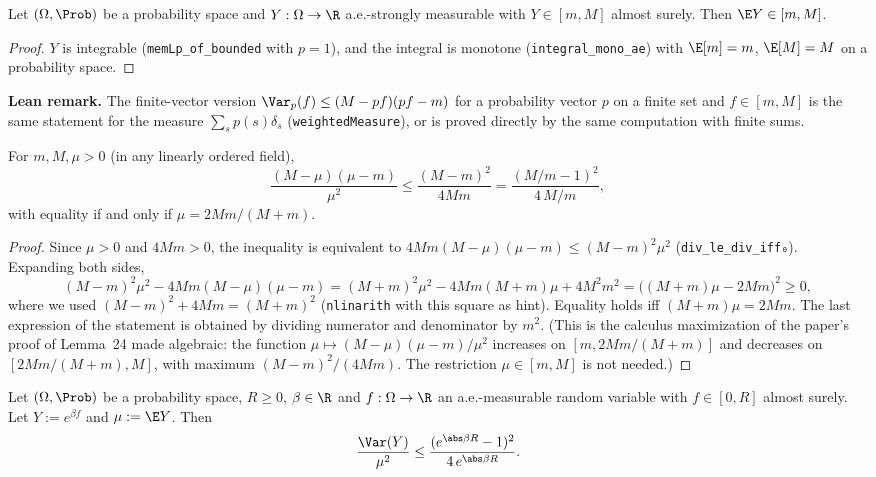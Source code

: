 \begin{lemma}\label{lem:pana_integral_mem_Icc}
\leanok
Let $(\Omega, \Prob)$ be a probability space and $Y : \Omega \to \R$ a.e.-strongly measurable
with $Y \in [m, M]$ almost surely. Then $\E Y \in [m, M]$.
\end{lemma}

\begin{proof}
\leanok
$Y$ is integrable (\texttt{memLp\_of\_bounded} with $p = 1$), and the integral is monotone
(\texttt{integral\_mono\_ae}) with $\E[m] = m$, $\E[M] = M$ on a probability space.
\end{proof}

\textbf{Lean remark.} The finite-vector version $\Var_p(f) \le (M - pf)(pf - m)$ for a
probability vector $p$ on a finite set and $f \in [m, M]$ is the same statement for the measure
$\sum_s p(s)\delta_s$ (\texttt{weightedMeasure}), or is proved directly by the same computation
with finite sums.

\begin{lemma}\label{lem:pana_var_ratio_max}
\leanok
For $m, M, \mu > 0$ (in any linearly ordered field),
\[
  \frac{(M - \mu)(\mu - m)}{\mu^2} \le \frac{(M - m)^2}{4Mm}
  = \frac{(M/m - 1)^2}{4\,M/m},
\]
with equality if and only if $\mu = 2Mm/(M + m)$.
\end{lemma}

\begin{proof}
\leanok
Since $\mu > 0$ and $4Mm > 0$, the inequality is equivalent to
$4Mm(M - \mu)(\mu - m) \le (M - m)^2\mu^2$ (\texttt{div\_le\_div\_iff₀}). Expanding both sides,
\[
  (M - m)^2\mu^2 - 4Mm(M - \mu)(\mu - m)
  = (M + m)^2\mu^2 - 4Mm(M + m)\mu + 4M^2m^2
  = \big((M + m)\mu - 2Mm\big)^2 \ge 0 ,
\]
where we used $(M - m)^2 + 4Mm = (M + m)^2$ (\texttt{nlinarith} with this square as hint).
Equality holds iff $(M + m)\mu = 2Mm$. The last
expression of the statement is obtained by dividing numerator and denominator by $m^2$.
(This is the calculus maximization of the paper's proof of Lemma~24 made algebraic: the
function $\mu \mapsto (M - \mu)(\mu - m)/\mu^2$ increases on $[m, 2Mm/(M + m)]$ and decreases
on $[2Mm/(M + m), M]$, with maximum $(M - m)^2/(4Mm)$. The restriction $\mu \in [m, M]$ is not
needed.)
\end{proof}

\begin{lemma}\label{lem:normalized_variance_bound}
\leanok
Let $(\Omega, \Prob)$ be a probability space, $R \ge 0$, $\beta \in \R$ and $f : \Omega \to \R$
an a.e.-measurable random variable with $f \in [0, R]$ almost surely. Let $Y := e^{\beta f}$
and $\mu := \E Y$. Then
\[
  \frac{\Var(Y)}{\mu^2} \le \frac{(e^{\abs\beta R} - 1)^2}{4\,e^{\abs\beta R}} .
\]
\end{lemma}

